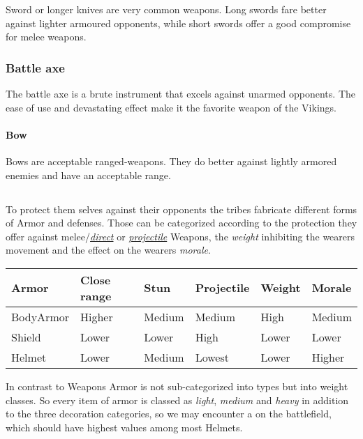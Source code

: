 Sword or longer knives are very common weapons. Long swords fare better against
lighter armoured opponents, while short swords offer a good compromise for
melee weapons.

\subsubsection{Battle axe}\label{ch:Goods:Armory:Weapons:BattleAxe}

The battle axe is a brute instrument that excels against unarmed opponents. The
ease of use and devastating effect make it the favorite weapon of the
\gls{Vikings}.

\paragraph{Bow}

Bows are acceptable ranged-weapons. They do better against lightly armored
enemies and have an acceptable range.

\subsection{}\label{ch:Goods:Armory:Armor}

To protect them selves against their opponents the tribes fabricate different
forms of \gls*{Armor} and defenses. Those can be categorized according to the
protection they offer against melee/\hyperref[ch:Conflict]{\emph{direct}} or
\hyperref[ch:Conflict]{\emph{projectile}} \glspl{Weapon}, the \emph{weight}
inhibiting the wearers movement and the effect on the wearers \emph{morale}.

\begin{longtable}{llllll}
	\toprule
	\Gls*{Armor}
	 & Close range & Stun   & Projectile & Weight & Morale \\
	\midrule
	\Gls{BodyArmor}
	 & Higher      & Medium & Medium     & High   & Medium \\
	\Gls{Shield}
	 & Lower       & Lower  & High       & Lower  & Lower  \\
	\Gls{Helmet}
	 & Lower       & Medium & Lowest     & Lower  & Higher \\
	\bottomrule
\end{longtable}

In contrast to \glspl{Weapon} \gls*{Armor} is not sub-categorized into types
but into weight classes. So every item of armor is classed as \emph{light},
\emph{medium} and \emph{heavy} in addition to the three decoration categories,
so we may encounter a  on the
battlefield, which should have highest values among most \glspl{Helmet}.


